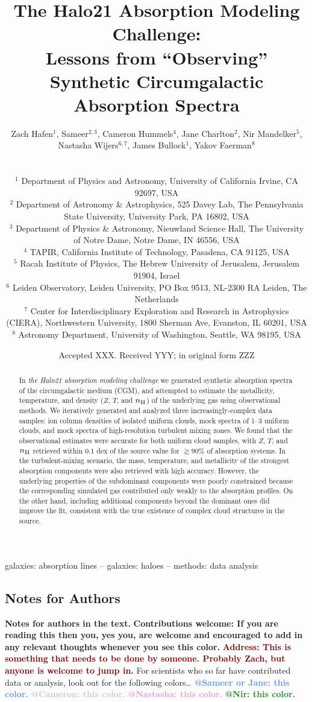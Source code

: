 \documentclass[fleqn,usenatbib]{mnras}
\title[``Observing'' Synthetic Circumgalactic Absorption Spectra]{The Halo21 Absorption Modeling Challenge:\\Lessons from ``Observing'' Synthetic Circumgalactic Absorption Spectra}
\author[Hafen, Sameer, et al.]{
\parbox{\textwidth}{
Zach Hafen$^{1}$,
Sameer$^{2,3}$,
Cameron Hummels$^4$,
Jane Charlton$^2$,
Nir Mandelker$^5$,
Nastasha Wijers$^{6, 7}$,
James Bullock$^{1}$,
Yakov Faerman$^{8}$
} \vspace{0.4cm}\\
\parbox{\textwidth}{
$^1$ Department of Physics and Astronomy, University of California Irvine, CA 92697, USA \\
$^{2}$ Department of Astronomy \& Astrophysics, 525 Davey Lab, The Pennsylvania State University, University Park, PA 16802, USA \\
$^{3}$ Department of Physics \& Astronomy, Nieuwland Science Hall, The University of Notre Dame, Notre Dame, IN 46556, USA \\
$^4$ TAPIR, California Institute of Technology, Pasadena, CA 91125, USA \\
$^5$ Racah Institute of Physics, The Hebrew University of Jerusalem,
Jerusalem 91904, Israel \\
$^6$ Leiden Observatory, Leiden University, PO Box 9513, NL-2300 RA Leiden, The Netherlands \\
$^7$ Center for Interdisciplinary Exploration and Research in Astrophysics (CIERA), Northwestern University, 1800 Sherman Ave, Evanston, IL 60201, USA \\
$^8$ Astronomy Department, University of Washington, Seattle, WA
98195, USA
}
}
\date{Accepted XXX. Received YYY; in original form ZZZ}
\makeatletter
\newcommand{\thoughts}[1]{\textcolor{BurntOrange}{\textbf{Contributions welcome: #1}}}
\newcommand{\todo}[1]{\textcolor{Maroon}{\textbf{Address: #1}}}
\newcommand{\atsameer}[1]{\textcolor{CornflowerBlue}{\textbf{@Sameer or Jane: #1}}}
\newcommand{\atcameron}[1]{\textcolor{Thistle}{\textbf{@Cameron: #1}}}
\newcommand{\atnastasha}[1]{\textcolor{Plum}{\textbf{@Nastasha: #1}}}
\newcommand{\atnir}[1]{\textcolor{ForestGreen}{\textbf{@Nir: #1}}}
\makeatother
\begin{document}
\label{firstpage}
\pagerange{\pageref{firstpage}--\pageref{lastpage}}
\maketitle

\begin{abstract}
In \textit{the Halo21 absorption modeling challenge} we generated synthetic absorption spectra of the circumgalactic medium (CGM),
and attempted to estimate the metallicity, temperature, and density ($Z$, $T$, and $n_{\rm H}$) of the underlying gas using observational methods.
We iteratively generated and analyzed three increasingly-complex data samples:
ion column densities of isolated uniform clouds,
mock spectra of 1--3 uniform clouds,
and mock spectra of high-resolution turbulent mixing zones.
We found that the observational estimates were accurate for both uniform cloud samples, with $Z$, $T$, and $n_{\rm H}$ retrieved within $0.1$ dex of the source value for $\gtrsim 90\%$ of absorption systems.
In the turbulent-mixing scenario, the mass, temperature, and metallicity of the strongest absorption components were also retrieved with high accuracy.
However, the underlying properties of the subdominant components were poorly constrained because the corresponding simulated gas contributed only weakly to the  absorption profiles.
On the other hand, including
additional components beyond the dominant ones did improve the fit, consistent with the true existence of complex cloud structures in the source. 
\end{abstract}

\begin{keywords}
galaxies: absorption lines -- galaxies: haloes -- methods: data analysis
\end{keywords}



\subsection{Notes for Authors}
 
\textbf{Notes for authors in the text.}
\thoughts{If you are reading this then you, yes you, are welcome and encouraged to add in any relevant thoughts whenever you see this color.}
\todo{This is something that needs to be done by someone. Probably Zach, but anyone is welcome to jump in.}
For scientists who so far have contributed data or analysis, look out for the following colors\ldots
\atsameer{this color.}
\atcameron{this color.}
\atnastasha{this color.}
\atnir{this color.}
\end{document}
